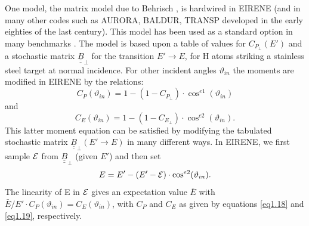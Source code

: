 One model, the matrix model due to Behrisch \cite{kn:Behrisch}, is hardwired in
EIRENE (and in many other codes such as AURORA, BALDUR, TRANSP developed in the
early eighties of the last century).
This model has been used as a standard option in many benchmarks
\cite{kn:Benchmark}.
The model is based upon a table of values for $C_{P_\perp} (E ')$ and a
stochastic matrix ${\underline{\underline{B}}}_{\perp}$ for the transition $E
  ' \rightarrow  E$, for H atoms striking a stainless steel target at normal
incidence.
For other incident angles $ \vartheta_{in}$ the moments are modified in EIRENE
by the relations:
\begin{equation}
  C_P ( \vartheta_{in} ) = 1   - (   1	 -   C_{P_\perp}) \cdot   \cos^{e1} (
  \vartheta_{in} ) \label{eq1.18}
\end{equation}
and
\begin{equation}
  C_E (
  \vartheta_{in} ) = 1   -   (   1   -   C_{E_\perp}) \cdot   \cos^{e2} (
  \vartheta_{in} )    .
  \label{eq1.19}
\end{equation}
This latter moment equation can be satisfied by modifying the tabulated
stochastic matrix ${\underline{\underline{B}}}_{\perp} (E' \rightarrow E)$ in
many different ways.
In EIRENE, we first sample ${\cal{E}}$ from ${\underline{\underline{B}}}
    _{\perp}$ (given $E '$) and then set
\begin{equation}
  E = E '	 -   (	 E ' -
  {\cal{E}}  ) \cdot   \cos^{e2} ( \vartheta_{in} )   .
  \label{eq1.20}
\end{equation}
The linearity of E in $ {\cal{E}}$ gives an expectation value $\bar {E}$ with $
  \bar {E} / E ' \cdot C_P( \vartheta_{in} ) = C_E ( \vartheta_{in} )$, with $C_P
$ and $C_E$ as given by equations \cref{eq1.18} and \cref{eq1.19},
respectively.

